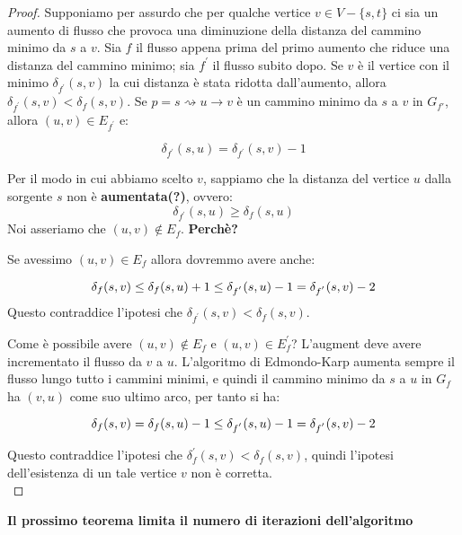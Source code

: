 \begin{proof}
    Supponiamo per assurdo che per qualche vertice $v \in V
        - \{s, t\}$ ci sia un aumento di flusso che provoca una diminuzione della
    distanza del cammino minimo da $s$ a $v$. Sia $f$ il flusso appena prima del
    primo aumento che riduce una distanza del cammino minimo; sia $f^{'}$ il flusso
    subito dopo. Se $v$ è il vertice con il minimo $\delta_{f^{'}}(s,v)$ la cui
    distanza è stata ridotta dall'aumento, allora $\delta_{f^{'}}(s,v) <
        \delta_{f}(s,v)$. Se $p = s \rightsquigarrow u \rightarrow v$ è un cammino
    minimo da $s$ a $v$ in $G_{f{'}}$, allora $(u,v) \in E_{f^{'}}$ e:

    $$
        \delta_{f^{'}}(s,u) = \delta_{f^{'}}(s,v) -1
    $$

    Per il modo in cui abbiamo scelto $v$, sappiamo che la distanza del vertice
    $u$ dalla sorgente $s$ non è \textbf{aumentata(?)}, ovvero:
    $$
        \delta_{f^{'}}(s,u) \ge \delta_{f}(s,u)
    $$
    Noi asseriamo che $(u,v) \notin E_f$. \textbf{Perchè?}

    Se avessimo $(u,v) \in E_f$ allora dovremmo avere anche:

    $$
        \delta_{f}(s,v) \le \delta_{f}(s,u) +1 \\
        \le \delta_{f^{'}}(s,u) -1 \\
        = \delta_{f^{'}}(s,v) -2
    $$
    Questo contraddice l'ipotesi che $\delta_{f^{'}}(s,v) < \delta_{f}(s,v)$.

    Come è possibile avere $(u,v) \notin E_f$ e $(u,v) \in E_f^{'}$? L'augment
    deve avere incrementato il flusso da $v$ a $u$. L'algoritmo di Edmondo-Karp
    aumenta sempre il flusso lungo tutto i cammini minimi, e quindi il cammino
    minimo da $s$ a $u$ in $G_f$ ha $(v,u)$ come suo ultimo arco, per tanto si
    ha:

    $$
        \delta_{f}(s,v) = \delta_{f}(s,u) -1 \\
        \le \delta_{f^{'}}(s,u) -1 \\
        = \delta_{f^{'}}(s,v) -2
    $$

    Questo contraddice l'ipotesi che $\delta_f^{'}(s,v) < \delta_f(s,v)$, quindi
    l'ipotesi dell'esistenza di un tale vertice $v$ non è corretta.\\
\end{proof}

\textbf{Il prossimo teorema limita il numero di iterazioni dell'algoritmo}\\


